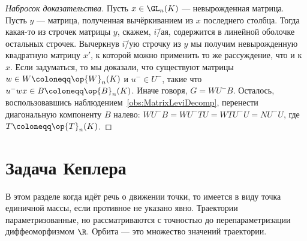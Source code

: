 \documentclass[
	extrafontsizes,
	11pt,
	hyphens,
]{memoir}
\begin{document}
\begin{proof}[Набросок доказательства]
Пусть \(x \in \GL_n(K)\) --- невырожденная матрица.
Пусть \(y\) --- матрица, полученная вычёркиванием из \(x\) последнего столбца.
Тогда какая-то из строчек матрицы \(y\), скажем, \(i\)\=/ая, содержится в линейной оболочке остальных строчек.
Вычеркнув \(i\)\=/ую строчку из \(y\) мы получим невырожденную квадратную матрицу \(x'\), к которой можно применить то же рассуждение, что и к \(x\).
Если задуматься, то мы доказали, что существуют матрицы \(w \in W \coloneqq \op{W}_n(K)\) и \(u^{-} \in U^{-}\), такие что \(u^{-} w x \in B \coloneqq \op{B}_n(K)\).
Иначе говоря, \(G = W U^{-} B\).
Осталось, воспользовавшись наблюдением~\ref{obs:MatrixLeviDecomp}, перенести диагональную компоненту \(B\) налево:
\(W U^{-} B = W U^{-} T U = W T U^{-} U = N U^{-} U\), где \(T \coloneqq \op{T}_n(K)\).
\end{proof}


\section{Задача Кеплера}

\begin{convention}[\scshape Траектории и орбиты]
В этом разделе когда идёт речь о движении точки, то имеется в виду точка единичной массы, если противное не указано явно.
Траектории параметризованные, но рассматриваются с точностью до перепараметризации диффеоморфизмом \(\R\).
Орбита --- это множество значений траектории.
\end{convention}


\end{document}

